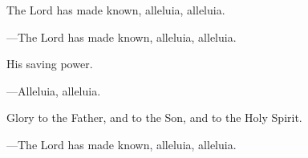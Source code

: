 \responsory

\begin{hangpar}
The Lord has made known, alleluia, alleluia.

{\color{red}---\thinspace }The Lord has made known, alleluia, alleluia.

\medskip His saving power.

{\color{red}---\thinspace }Alleluia, alleluia.

\medskip Glory to the Father, and to the Son, and to the Holy Spirit.

{\color{red}---\thinspace }The Lord has made known, alleluia, alleluia.
\end{hangpar}